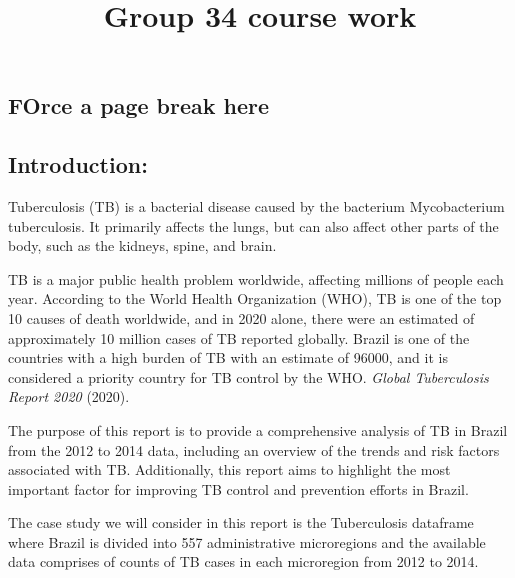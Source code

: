 \documentclass[
  letterpaper,
  DIV=11,
  numbers=noendperiod]{scrartcl}
\title{Group 34 course work}
\author{}
\date{}
\renewcommand*\contentsname{Table of contents}
\newcommand\contentsname{Table of contents}
\begin{document}
\maketitle
\ifdefined\Shaded\renewenvironment{Shaded}{\begin{tcolorbox}[borderline west={3pt}{0pt}{shadecolor}, enhanced, frame hidden, boxrule=0pt, breakable, interior hidden, sharp corners]}{\end{tcolorbox}}\fi

\renewcommand*\contentsname{Table of contents}
{
\hypersetup{linkcolor=}
\setcounter{tocdepth}{3}
\tableofcontents
}
\hypertarget{force-a-page-break-here}{%
\subsection{FOrce a page break here}\label{force-a-page-break-here}}

\hypertarget{introduction}{%
\subsection{Introduction:}\label{introduction}}

Tuberculosis (TB) is a bacterial disease caused by the bacterium
Mycobacterium tuberculosis. It primarily affects the lungs, but can also
affect other parts of the body, such as the kidneys, spine, and brain.

TB is a major public health problem worldwide, affecting millions of
people each year. According to the World Health Organization (WHO), TB
is one of the top 10 causes of death worldwide, and in 2020 alone, there
were an estimated of approximately 10 million cases of TB reported
globally. Brazil is one of the countries with a high burden of TB with
an estimate of 96000, and it is considered a priority country for TB
control by the WHO. \emph{Global Tuberculosis Report 2020} (2020).

The purpose of this report is to provide a comprehensive analysis of TB
in Brazil from the 2012 to 2014 data, including an overview of the
trends and risk factors associated with TB. Additionally, this report
aims to highlight the most important factor for improving TB control and
prevention efforts in Brazil.

The case study we will consider in this report is the Tuberculosis
dataframe where Brazil is divided into 557 administrative microregions
and the available data comprises of counts of TB cases in each
microregion from 2012 to 2014.
\end{document}
